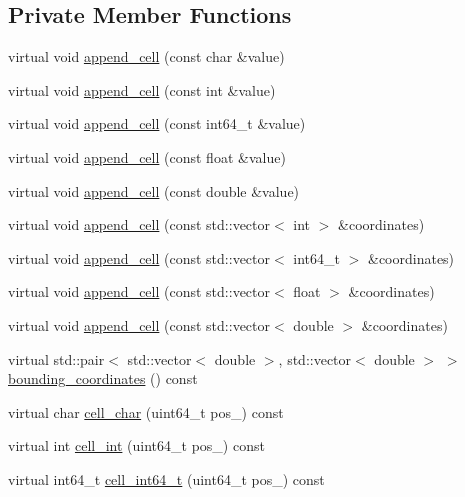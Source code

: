 \subsection*{Private Member Functions}
\begin{DoxyCompactItemize}
\item 
virtual void \hyperlink{classAttributeTile_a6db83cba74bd09b9e0074b1fb62f0e26}{append\+\_\+cell} (const char \&value)
\item 
virtual void \hyperlink{classAttributeTile_a2c25b5f630a7cd3530e37aa5fca36122}{append\+\_\+cell} (const int \&value)
\item 
virtual void \hyperlink{classAttributeTile_a8b00219cc1216ea7e9c8a79167da77f5}{append\+\_\+cell} (const int64\+\_\+t \&value)
\item 
virtual void \hyperlink{classAttributeTile_a53e9b89b9874b5dfba39470dcfe239ac}{append\+\_\+cell} (const float \&value)
\item 
virtual void \hyperlink{classAttributeTile_ae0c3ae668e6175194cb20e52b811a75b}{append\+\_\+cell} (const double \&value)
\item 
virtual void \hyperlink{classAttributeTile_a119121baacac02c8cadc32fd26166ca2}{append\+\_\+cell} (const std\+::vector$<$ int $>$ \&coordinates)
\item 
virtual void \hyperlink{classAttributeTile_a696631dbaff92373ef0a35531e3177ec}{append\+\_\+cell} (const std\+::vector$<$ int64\+\_\+t $>$ \&coordinates)
\item 
virtual void \hyperlink{classAttributeTile_a9b8ca1d8d5a7bbc257a7a94efbb55dd9}{append\+\_\+cell} (const std\+::vector$<$ float $>$ \&coordinates)
\item 
virtual void \hyperlink{classAttributeTile_a5275877be1c67045529e64b84d4c92aa}{append\+\_\+cell} (const std\+::vector$<$ double $>$ \&coordinates)
\item 
virtual std\+::pair$<$ std\+::vector$<$ double $>$, std\+::vector$<$ double $>$ $>$ \hyperlink{classAttributeTile_a38f90eb7f90bc879783b8f16250518d8}{bounding\+\_\+coordinates} () const 
\item 
virtual char \hyperlink{classAttributeTile_ab97b0b330390fcaf624e9bd5b58f87a1}{cell\+\_\+char} (uint64\+\_\+t pos\+\_\+) const 
\item 
virtual int \hyperlink{classAttributeTile_a832d9ea2abc9b55cce292bf62c579190}{cell\+\_\+int} (uint64\+\_\+t pos\+\_\+) const 
\item 
virtual int64\+\_\+t \hyperlink{classAttributeTile_a33c3b6f461c5ab1ea67feb171a6097ff}{cell\+\_\+int64\+\_\+t} (uint64\+\_\+t pos\+\_\+) const 

\end{DoxyCompactItemize}
